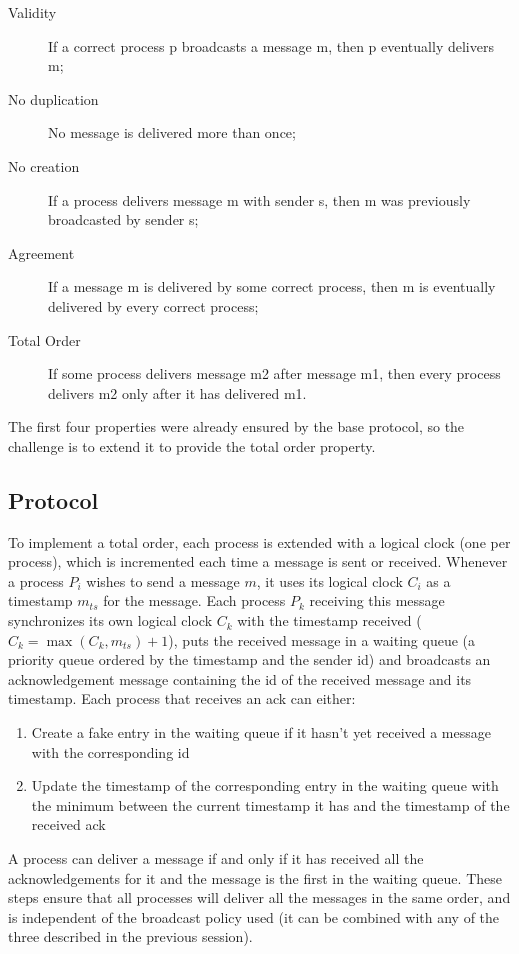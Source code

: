 \documentclass[a4paper, 11pt]{article}
\begin{document}
\begin{description}
	\item[Validity] If a correct process p broadcasts a message m, then p eventually delivers m;
	\item[No duplication] No message is delivered more than once;
	\item[No creation] If a process delivers message m with sender s, then m was previously broadcasted by sender s;
	\item[Agreement] If a message m is delivered by some correct process, then m is eventually delivered by every correct process;
	\item[Total Order] If some process delivers message m2 after message m1, then every process delivers m2 only after it has delivered m1.
\end{description}

	The first four properties were already ensured by the base protocol, so the challenge is to extend it to provide the total order property.

\subsection{Protocol}
	To implement a total order, each process is extended with a logical clock (one per process), which is incremented each time a message is sent or received. Whenever a process $P_i$ wishes to send a message $m$, it uses its logical clock $C_i$ as a timestamp $m_{ts}$ for the message. Each process $P_k$ receiving this message synchronizes its own logical clock $C_k$ with the timestamp received ($C_k = \max(C_k, m_{ts}) + 1$), puts the received message in a waiting queue (a priority queue ordered by the timestamp and the sender id) and broadcasts an acknowledgement message containing the id of the received message and its timestamp. Each process that receives an ack can either:

\begin{enumerate}
	\item Create a fake entry in the waiting queue if it hasn't yet received a message with the corresponding id
	\item Update the timestamp of the corresponding entry in the waiting queue with the minimum between the current timestamp it has and the timestamp of the received ack
\end{enumerate}

	A process can deliver a message if and only if it has received all the acknowledgements for it and the message is the first in the waiting queue. These steps ensure that all processes will deliver all the messages in the same order, and is independent of the broadcast policy used (it can be combined with any of the three described in the previous session).
	
\end{document}
